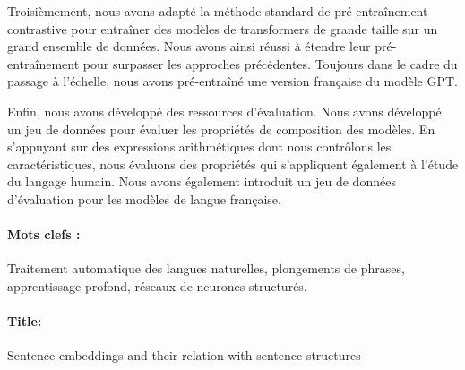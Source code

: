 Troisièmement, nous avons adapté la méthode standard de pré-entraînement contrastive pour entraîner des modèles de transformers de grande taille sur un grand ensemble de données. Nous avons ainsi réussi à étendre leur pré-entraînement pour surpasser les approches précédentes. Toujours dans le cadre du passage à l’échelle, nous avons pré-entraîné une version française du modèle GPT.

Enfin, nous avons développé des ressources d'évaluation. Nous avons développé un jeu de données pour évaluer les propriétés de composition des modèles. En s’appuyant sur des expressions arithmétiques dont nous contrôlons les caractéristiques, nous évaluons des propriétés qui s'appliquent également à l'étude du langage humain. Nous avons également introduit un jeu de données d'évaluation pour les modèles de langue française.


\paragraph{Mots clefs :} Traitement automatique des langues naturelles, plongements de phrases, apprentissage profond, réseaux de neurones structurés.


\newpage

\paragraph{Title:} Sentence embeddings and their relation with sentence structures

